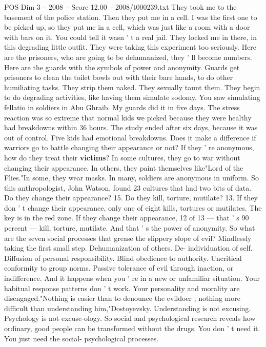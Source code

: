 \begin{textsample}{POS Dim 3 – 2008 – Score 12.00 – 2008/t000239.txt}
They took me to the basement of the police station.
Then they put me in a cell.
I was the first one to be picked up, so they put me in a cell, which was just like a room with a door with bars on it.
You could tell it wasn ' t a real jail.
They locked me in there, in this degrading little outfit.
They were taking this experiment too seriously.
Here are the prisoners, who are going to be dehumanized, they ' ll become numbers.
Here are the guards with the symbols of power and anonymity.
Guards get prisoners to clean the toilet bowls out with their bare hands, to do other humiliating tasks.
They strip them naked.
They sexually taunt them.
They begin to do degrading activities, like having them simulate sodomy.
You saw simulating fellatio in soldiers in Abu Ghraib.
My guards did it in five days.
The stress reaction was so extreme that normal kids we picked because they were healthy had breakdowns within 36 hours.
The study ended after six days, because it was out of control.
Five kids had emotional breakdowns.
Does it make a difference if warriors go to battle changing their appearance or not?
If they ' re anonymous, how do they treat their \textbf{victims}?
In some cultures, they go to war without changing their appearance.
In others, they paint themselves like"Lord of the Flies."In some, they wear masks.
In many, soldiers are anonymous in uniform.
So this anthropologist, John Watson, found 23 cultures that had two bits of data.
Do they change their appearance? 15.
Do they kill, torture, mutilate? 13.
If they don ' t change their appearance, only one of eight kills, tortures or mutilates.
The key is in the red zone.
If they change their appearance, 12 of 13 — that ' s 90 percent — kill, torture, mutilate.
And that ' s the power of anonymity.
So what are the seven social processes that grease the slippery slope of evil?
Mindlessly taking the first small step.
Dehumanization of others.
De- individuation of self.
Diffusion of personal responsibility.
Blind obedience to authority.
Uncritical conformity to group norms.
Passive tolerance of evil through inaction, or indifference.
And it happens when you ' re in a new or unfamiliar situation.
Your habitual response patterns don ' t work.
Your personality and morality are disengaged."Nothing is easier than to denounce the evildoer ; nothing more difficult than understanding him,"Dostoyevsky.
Understanding is not excusing.
Psychology is not excuse-ology.
So social and psychological research reveals how ordinary, good people can be transformed without the drugs.
You don ' t need it.
You just need the social- psychological processes.

\end{textsample}
